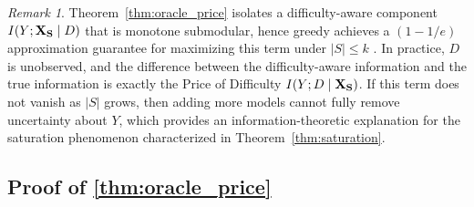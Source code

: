 \documentclass{article}
\theoremstyle{plain}
\theoremstyle{definition}
\theoremstyle{remark}
\newtheorem{remark}[theorem]{Remark}
\begin{document}
\begin{remark}
\label{rem:oracle_price}
Theorem~\ref{thm:oracle_price} isolates a difficulty-aware component $I(Y;{\bf X_S}\mid D)$ that is monotone submodular, hence greedy achieves a $(1-1/e)$ approximation guarantee for maximizing this term under $|S|\le k$ \citep{krause2014submodular}.
In practice, $D$ is unobserved, and the difference between the difficulty-aware information and the true information is exactly the Price of Difficulty $I(Y;D\mid {\bf X_S} )$.
If this term does not vanish as $|S|$ grows, then adding more models cannot fully remove uncertainty about $Y$, which provides an information-theoretic explanation for the saturation phenomenon characterized in Theorem~\ref{thm:saturation}.
\end{remark}

\subsection{Proof of \cref{thm:oracle_price}}
\label{app:proof_oracle_price}
\end{document}
